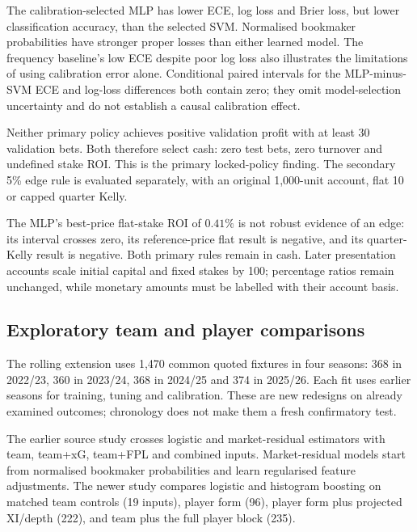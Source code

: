 \documentclass[11pt,letterpaper]{article}
\newcommand{\resulttable}[3]{\begin{table}[htbp]\centering\small\caption{#1}\label{#2}\end{table}}
\begin{document}
\resulttable{Locked EPL 2025/26 probability scores on 374 identical fixtures.
ECE is mean classwise error with ten bins.}
{tab:epl_primary_scores}{epl_primary_scores.tex}
The calibration-selected MLP has lower ECE, log loss and Brier loss, but
lower classification accuracy, than the selected SVM. Normalised bookmaker
probabilities have stronger proper losses than either learned model. The
frequency baseline's low ECE despite poor log loss also illustrates the
limitations of using calibration error alone. Conditional paired intervals
for the MLP-minus-SVM ECE and log-loss differences both contain zero; they
omit model-selection uncertainty and do not establish a causal calibration effect.

Neither primary policy achieves positive validation profit with at least
30 validation bets. Both therefore select cash: zero test bets, zero
turnover and undefined stake ROI. This is the primary locked-policy finding.
The secondary 5\% edge rule is evaluated separately, with an original
1,000-unit account, flat 10 or capped quarter Kelly.

\resulttable{Secondary EPL 5\% edge replay on the test season; native initial
capital 1,000. Stake ROI is profit divided by turnover.}
{tab:epl_secondary}{epl_secondary.tex}
The MLP's best-price flat-stake ROI of $0.41\%$ is not robust evidence of an
edge: its interval crosses zero, its reference-price flat result is negative,
and its quarter-Kelly result is negative. Both primary rules remain in cash.
Later presentation accounts scale initial capital and fixed stakes by 100;
percentage ratios remain unchanged, while monetary amounts must be labelled
with their account basis.

\subsection{Exploratory team and player comparisons}
The rolling extension uses 1,470 common quoted fixtures in four seasons:
368 in 2022/23, 360 in 2023/24, 368 in 2024/25 and 374 in 2025/26. Each fit
uses earlier seasons for training, tuning and calibration. These are new
redesigns on already examined outcomes; chronology does not make them a fresh
confirmatory test.

The earlier source study crosses logistic and market-residual estimators
with team, team+xG, team+FPL and combined inputs. Market-residual models start
from normalised bookmaker probabilities and learn regularised feature
adjustments. The newer study compares logistic and histogram boosting on
matched team controls (19 inputs), player form (96), player form plus
projected XI/depth (222), and team plus the full player block (235).
\end{document}
